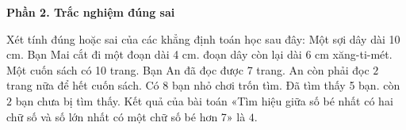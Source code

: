 \textbf{Phần 2. Trắc nghiệm đúng sai}

\begin{ex} %
Xét tính đúng hoặc sai của các khẳng định toán học sau đây:
\choiceTF
{\True Một sợi dây dài 10 cm. Bạn Mai cắt đi một đoạn dài 4 cm. đoạn dây còn lại dài $6\text{ cm}$ xăng-ti-mét.}
{Một cuốn sách có 10 trang. Bạn An đã đọc được 7 trang. An còn phải đọc $2$ trang nữa để hết cuốn sách.}
{Có 8 bạn nhỏ chơi trốn tìm. Đã tìm thấy 5 bạn. còn $2$ bạn chưa bị tìm thấy.}
{\True Kết quả của bài toán «Tìm hiệu giữa số bé nhất có hai chữ số và số lớn nhất có một chữ số bé hơn 7» là $4$.}
\end{ex}

